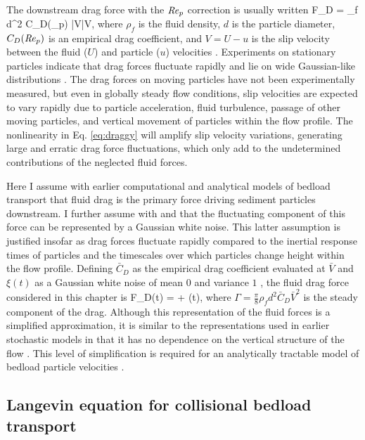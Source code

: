 The downstream drag force with the $\mbox{\textit{Re}}_p$ correction is usually written 
\be F_D =  \rho_f d^2 C_D(\Rey_p) |V|V, \label{eq:draggy}\ee
where $\rho_f$ is the fluid density, $d$ is the particle diameter, $C_D(\mbox{\textit{Re}}_p)$ is an empirical drag coefficient, and $V = U-u$ is the slip velocity between the fluid ($U$) and particle ($u$) velocities \citep{Coleman1967, Schmeeckle2007, Dwivedi2012}.
Experiments on stationary particles indicate that drag forces fluctuate rapidly and lie on wide Gaussian-like distributions \citep{Hofland2006,Schmeeckle2007,Dwivedi2010,Celik2014}.
The drag forces on moving particles have not been experimentally measured, but even in globally steady flow conditions, slip velocities are expected to vary rapidly due to particle acceleration, fluid turbulence, passage of other moving particles, and vertical movement of particles within the flow profile.
The nonlinearity in Eq. \ref{eq:draggy} will amplify slip velocity variations, generating large and erratic drag force fluctuations, which only add to the undetermined contributions of the neglected fluid forces.

Here I assume with earlier computational \citep{Schmeeckle2014,Gonzalez2017,Elghannay2017} and analytical \citep[e.g.][]{Ancey2014,Fan2014} models of bedload transport that fluid drag is the primary force driving sediment particles downstream. I further assume with \citet{Fan2014} and \citet{Ancey2014} that the fluctuating component of this force can be represented by a Gaussian white noise.
This latter assumption is justified insofar as drag forces fluctuate rapidly compared to the inertial response times of particles and the timescales over which particles change height within the flow profile.
Defining $\bar{C}_D$ as the empirical drag coefficient evaluated at $\bar{V}$ and $\xi(t)$ as a Gaussian white noise of mean $0$ and variance $1$ \citep[e.g.][]{Gardiner1983}, the fluid drag force considered in this chapter is
\be F_D(t) = \Gamma +  \eta(t), \label{eq:drag}\ee
where $\Gamma = \frac{\pi}{8}
\rho_f d^2 \bar{C}_D \bar{V}^2$ is the steady component of the drag.
Although this representation of the fluid forces is a simplified approximation, it is similar to the representations used in earlier stochastic models in that it has no dependence on the vertical structure of the flow \citep[e.g.][]{Fan2014,Ancey2014}. This level of simplification is required for an analytically tractable model of bedload particle velocities \citep[e.g.][]{Michaelides1997}.

\subsection{Langevin equation for collisional bedload transport}

